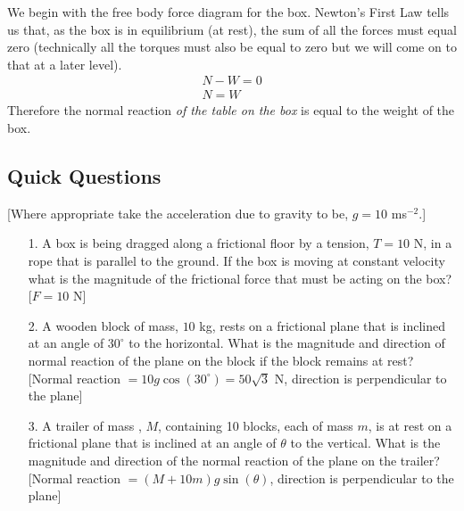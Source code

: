 \noindent We begin with the free body force diagram for the box.  Newton's First Law tells us that, as the box is in equilibrium (at rest), the sum of all the forces must equal zero (technically all the torques must also be equal to zero but we will come on to that at a later level).
\begin{eqnarray}
N-W=0 \\
N=W
\end{eqnarray}
Therefore the normal reaction {\it of the table on the box} is equal to the weight of the box.

\subsection*{Quick Questions}
[Where appropriate take the acceleration due to gravity to be, $g=10$ ms$^{-2}$.]
\begin{itemize}
\item[1.]  A box is being dragged along a frictional floor by a tension, $T=10$ N, in a rope that is parallel to the ground.  If the box is moving at constant velocity what is the magnitude of the frictional force that must be acting on the box?
\color{red}[$F=10$ N]\color{black}
\item[2.] A wooden block of mass, $10$ kg, rests on a frictional plane that is inclined at an angle of $30^\circ$ to the horizontal.  What is the magnitude and direction of normal reaction of the plane on the block if the block remains at rest?
\color{red}[Normal reaction $=10g\cos(30^\circ)=50\sqrt{3}$ N, direction is perpendicular to the plane]\color{black}
\item[3.] A trailer of mass , $M$, containing 10 blocks, each of mass $m$, is at rest on a frictional plane that is inclined at an angle of $\theta$ to the vertical.  What is the magnitude and direction of the normal reaction of the plane on the trailer?
\color{red}[Normal reaction $=(M+10m)g\sin(\theta)$, direction is perpendicular to the plane]\color{black}
\end{itemize}
\pagebreak
